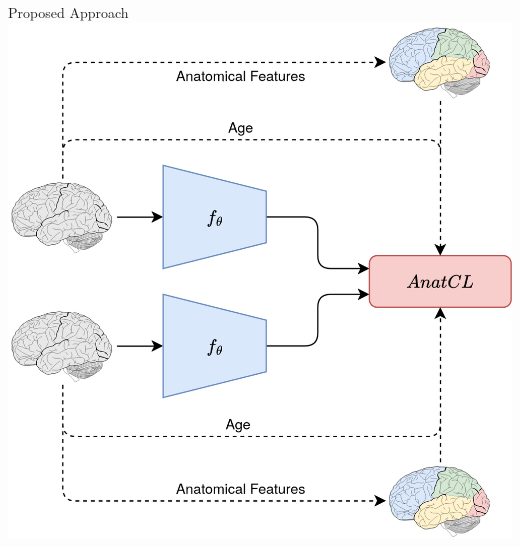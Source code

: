 \documentclass[12pt,aspectratio=169]{beamer}
\begin{document}
\begin{frame}{Proposed Approach}
    \centering
    \includegraphics[width=.4\textwidth]{source/anatcl_summary.png}
\end{frame}



\end{document}
